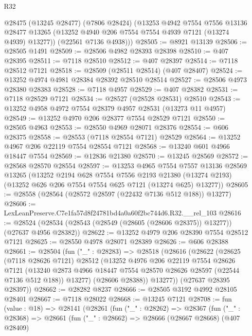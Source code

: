 \begin{lexlean}{R32}
\begin{coremodule}
      @28475
        (@13245 @28477)
        (@7806 @28424)
        (@13253
          @4942
          @7554
          @7556
          @13136
          @28477
          @13265
          (@13252 @4940 @206 @7554 @7554 @4939 @7121 (@13274 @4939) @13277))
        (@22561 @7136 @4938)))
@28505 := @8921 @13139
@28506 := @28505 @1491
@28509 := @28506 @4982 @28393 @28398
@28510 := @407 @28395
@28511 := @7118 @28510
@28512 := @407 @28397
@28514 := @7118 @28512 @7121
@28518 := @28509 (@28511 @28514) (@407 @28407)
@28524 := @13252 @4974 @4981 @28384 @28392 @28510 @28514
@28527 := @28506 @4973 @28380 @28383
@28528 := @7118 @4957
@28529 := @407 @28382
@28531 := @7118 @28529 @7121
@28534 := @28527 (@28528 @28531) @28510
@28543 := @13252 @4958 @4972 @7554 @28379 @4957 @28531 (@13273 @11 @4957)
@28549 := @13252 @4970 @206 @28377 @7554 @28529 @7121
@28550 := @28505 @4963
@28553 := @28550 @4969 @28071 @28376
@28554 := @606 @28375
@28558 := @28553 (@7118 @28554 @7121) @28529
@28564 := @13252 @4967 @206 @22119 @7554 @28554 @7121
@28568 := @13240 @601 @4966 @18447 @7554
@28569 := @12836 @21380
@28570 := @13245 @28569
@28572 := @28568 @28570 @28554
@28597 := @13253
    @4965
    @7554
    @7557
    @13136
    @28569
    @13265
    (@13252
      @2194
      @628
      @7554
      @7556
      @2193
      @21380
      (@13274 @2193)
      (@13252 @626 @206 @7554 @7554 @625 @7121 (@13274 @625) @13277))
@28605 := @28558 (@28564 (@28572 @28597 (@22432 @7136 @512 @188)) @13277)
@28606 := LexLeanPreserve.C7e1fa57d8f24781bd4a0a60f2bc744d6.R32.__rel_103
@28616 := @28524 (@28534 (@28543 (@28549 (@28605 (@28606 @28375)) @13277)) (@27637 @4956 @28382))
@28622 := @13252 @4979 @206 @28390 @7554 @28512 @7121
@28625 := @28550 @4978 @28071 @28389
@28626 := @606 @28388
@28661 := @28504
    (fun ("_" : @28283) =>
    @28518
      (@28616
        (@28622
          (@28625
            (@7118 @28626 @7121)
            @28512
            (@13252
              @4976
              @206
              @22119
              @7554
              @28626
              @7121
              (@13240 @2873 @4966 @18447 @7554 @28570 @28626 @28597 (@22544 @7136 @512 @188))
              @13277)
            (@28606 @28388))
          @13277))
      (@27637 @28395 @28397))
@28662 := @28282 @8237
@28666 := @28505 @3192 @4992 @28105 @28401
@28667 := @7118 @28022
@28668 := @13245 @7121
@28708 := fun (value : @18) =>
  @28141
    (@28261
      (fun ("_" : @28262) =>
      @28367
        (fun ("_" : @28368) =>
        @28661
          (fun ("_" : @28662) =>
          @28666
            (@28667 @28668)
            (@407 @28409)

\end{coremodule}
\end{lexlean}
